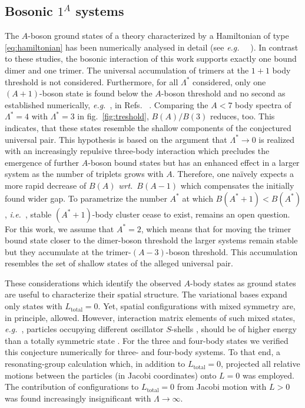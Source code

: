 \documentclass[preprint,12pt]{elsarticle}
\newcommand{\es}{1\text{\scriptsize s}}
\newcommand{\zs}{2\text{\scriptsize s}}
\newcommand{\wrt}{\textit{wrt.}~}
\newcommand{\eg}{\textit{e.g.}~}
\newcommand{\ie}{\textit{i.e.}~}
\newcommand{\figref}[1]{fig.~\ref{#1}}
\begin{document}
\subsection{Bosonic $1^{A}$ systems}
The $A$-boson ground states of a theory characterized by a Hamiltonian of
type \eqref{eq:hamiltonian}
has been numerically analysed in detail (see \eg~ \cite{Bazak:2016wxm,2015PhRvA..92c3626Y,Gattobigio:2012tk,vonStecher:2011zz,Gattobigio:2011ey}).
In contrast to these studies, the bosonic interaction of this work supports
exactly one bound dimer and one trimer. The universal accumulation of trimers
at the $1+1$ body threshold is not considered. Furthermore, for all $\Lambda^*$
considered, only one $(A+1)$-boson state is found below
the $A$-boson threshold and no second as established numerically, \eg, in Refs.~
\cite{Hammer:2006ct,2009NatPh...5..417V,vonStecher:2011zz}.
Comparing the $A<7$ body spectra of $\Lambda^*=4$ with $\Lambda^*=3$ in
\figref{fig:treshold}, $B(A)/B(3)$ reduces, too. This indicates, that these states
resemble the shallow components of the conjectured universal pair. This hypothesis is
based on the argument that $\Lambda^*\to0$ is realized with an increasingly repulsive
three-body interaction which precludes the emergence of further $A$-boson bound states
but has an enhanced effect in a larger system as the number of triplets grows
with $A$. Therefore, one na\"ively expects a more rapid decrease of $B(A)$ \wrt $B(A-1)$ which compensates the initially found wider gap. To parametrize the
number $A^*$ at which $B(A^*+1)<B(A^*)$, \ie, stable $(A^*+1)$-body
cluster cease to exist, remains an open question.
For this work, we assume that $A^*=2$, which
means that for moving the trimer bound state closer to the dimer-boson threshold
the larger systems remain stable but they accumulate at the trimer-$(A-3)$-boson
threshold. This accumulation resembles the set of shallow states of the
alleged universal pair.

These considerations which identify the observed $A$-body states as ground
states are useful to characterize their spatial structure. The variational
bases expand only states with $L_\text{total}=0$. Yet, spatial configurations with
mixed symmetry are, in principle, allowed. However, interaction matrix elements
of such mixed states, \eg, particles occupying different oscillator $S$-shells
\scalebox{0.8}{$\young(\es,\zs)$}, 
should be of higher energy than a totally symmetric state
\scalebox{0.8}{$\young(\es\es)$}. For the three and four-body states we verified
this conjecture numerically for three- and four-body systems. To that end, a
resonating-group calculation which, in addition to $L_\text{total}=0$, projected
all relative motions between the particles (in Jacobi coordinates) onto $L=0$ was
employed. The contribution of configurations to $L_\text{total}=0$ from
Jacobi motion with $L>0$ was found increasingly insignificant with $\Lambda\to\infty$.
\end{document}
